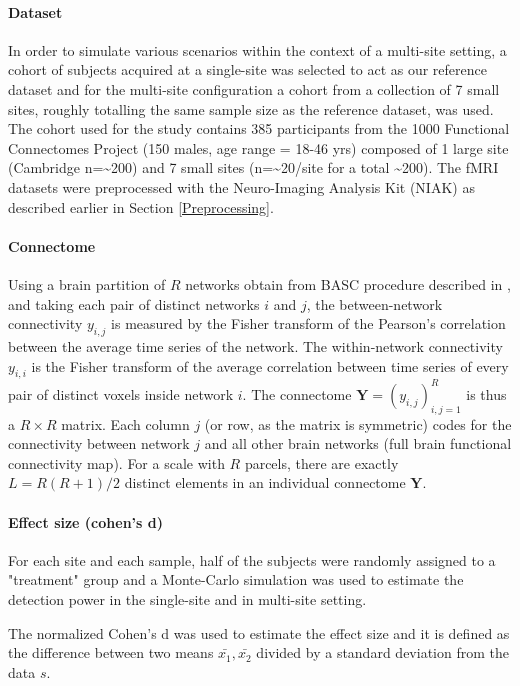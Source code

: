 \paragraph{Dataset}
In order to simulate various scenarios within the context of a multi-site setting, a cohort of subjects acquired at a single-site was selected to act as our reference dataset and for the multi-site configuration a cohort from a collection of 7 small sites, roughly totalling the same sample size as the reference dataset, was used. The cohort used for the study contains 385 participants from the 1000 Functional Connectomes Project \citep{Biswal2010} (150 males, age range = 18-46 yrs) composed of 1 large site (Cambridge n=\textasciitilde200) and 7 small sites (n=\textasciitilde20/site for a total \textasciitilde200). The fMRI datasets were preprocessed with the Neuro-Imaging Analysis Kit (NIAK) as described earlier in Section \ref{Preprocessing}.

\paragraph{Connectome}
Using a brain partition of $R$ networks obtain from BASC procedure described in \cite{Bellec2010c}, and taking each pair of distinct networks $i$ and $j$, the between-network connectivity $y_{i,j}$ is measured by the Fisher transform of the Pearson's correlation between the average time series of the network. The within-network connectivity $y_{i,i}$ is the Fisher transform of the average correlation between time series of every pair of distinct voxels inside network $i$. The connectome $\mathbf{Y}=(y_{i,j})_{i,j=1}^R$ is thus a $R\times R$ matrix. Each column $j$ (or row, as the matrix is symmetric) codes for the connectivity between network $j$ and all other brain networks (full brain functional connectivity map). For a scale with $R$ parcels, there are exactly $L=R(R+1)/2$ distinct elements in an individual connectome $\mathbf{Y}$. 

\paragraph{Effect size (cohen's d)}
For each site and each sample, half of the subjects were randomly assigned to a "treatment" group and a Monte-Carlo simulation was used to estimate the detection power in the single-site and in multi-site setting.

The normalized Cohen's d was used to estimate the effect size and it is defined as the difference between two means $\bar{x_{1}},\bar{x_{2}}$ divided by a standard deviation from the data $s$.

